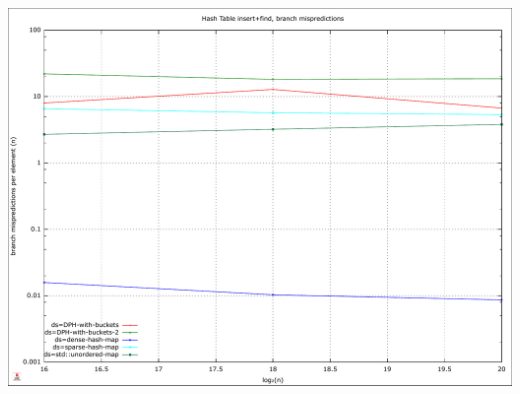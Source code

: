 \documentclass{article}
\begin{document}
\includegraphics[width=\linewidth]{img/hash_insert-find_branchmiss}
\raggedright
\end{document}
